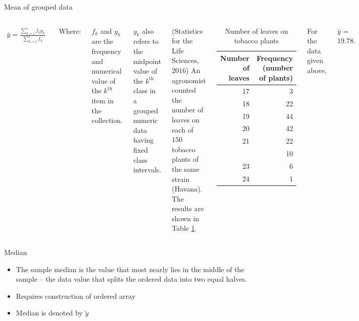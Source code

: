 \documentclass[
  ignorenonframetext,
  aspectratio=169]{beamer}
\providecommand{\tightlist}{%
  \setlength{\itemsep}{0pt}\setlength{\parskip}{0pt}}
\begin{document}
\begin{frame}{Mean of grouped data}
\protect\hypertarget{mean-of-grouped-data}{}
\small

\begin{columns}[T, onlytextwidth]

$$
\begin{aligned}
\bar{y} = \frac{\sum_{k= 1}^r f_k y_k}{\sum_{k= 1}^r f_k}
\end{aligned}
$$

Where:

$f_k$ and $y_k$ are the frequency and numerical value of the $k^{\text{th}}$ item in the collection. 

$y_k$ also refers to the midpoint value of the $k^{\text{th}}$ class in a grouped numeric data having fixed class intervals.


(Statistics for the Life Sciences, 2016) An agronomist counted the number of leaves on each of 150 tobacco plants of the same strain (Havana). The results are shown in Table \ref{tab:num-leaves-tobacco}.

\begin{table}

\caption{\label{tab:num-leaves-tobacco}Number of leaves on tobacco plants}
\centering
\fontsize{7}{9}\selectfont
\begin{tabular}[t]{rr}
\toprule
Number of leaves & Frequency (number of plants)\\
\midrule
17 & 3\\
18 & 22\\
19 & 44\\
20 & 42\\
21 & 22\\
\addlinespace
22 & 10\\
23 & 6\\
24 & 1\\
\bottomrule
\end{tabular}
\end{table}

For the data given above,

$\bar{y}$ = 19.78.

\end{columns}
\end{frame}

\begin{frame}{Median}
\protect\hypertarget{median}{}
\begin{itemize}
\tightlist
\item
  The sample median is the value that most nearly lies in the middle of
  the sample -- the data value that splits the ordered data into two
  equal halves.
\item
  Requires construction of ordered array
\item
  Median is denoted by \(\tilde{y}\)
\end{itemize}
\end{frame}
\end{document}
